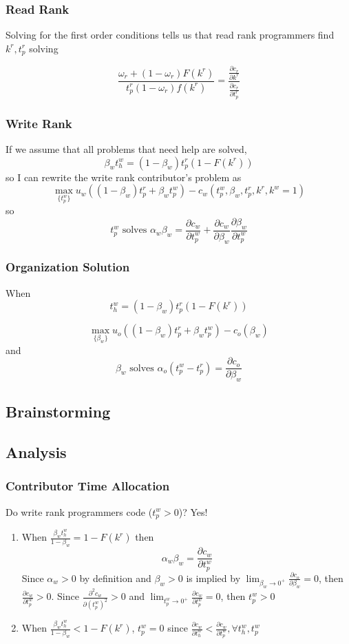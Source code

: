\documentclass[12pt,notitlepage]{article}
\begin{document}
\subsubsection{Read Rank}
Solving for the first order conditions tells us that read rank programmers find $k^r, t_p^r$ solving 


$$\frac{\omega_r + (1-\omega_r) F(k^r)}{t_p^r(1-\omega_r)f(k^r)} = \frac{\frac{\partial c_r}{\partial k^r}}{\frac{\partial c_r}{\partial t_p^r}}$$
\subsubsection{Write Rank}
If we assume that all problems that need help are solved, $$\beta_w t_h^w = (1-\beta_w) t_p^r (1-F(k^r))$$ so I can rewrite the write rank contributor's problem as
$$\max_{\{t_p^w\}} u_w\left((1-\beta_w) t_p^r + \beta_w t_p^w\right) - c_w(t_p^w, \beta_w, t_p^r, k^r, k^w = 1)$$
so $$t_p^w \text{ solves } \alpha_w \beta_w = \frac{\partial c_w}{\partial t_p^w} + \frac{\partial c_w}{\partial \beta_w}\frac{\partial \beta_w}{\partial t_p^w}$$

\subsubsection{Organization Solution}
When $$t_h^w = (1-\beta_w) t_p^r (1-F(k^r))$$ 

$$\max_{\{\beta_w\}} u_o\left((1-\beta_w) t_p^r + \beta_w t_p^w\right) - c_o(\beta_w)$$ 
and $$\beta_w \text{ solves } \alpha_o (t_p^w - t_p^r) = \frac{\partial c_o}{\partial \beta_w}$$

\subsection{Brainstorming}

\subsection{Analysis}
\subsubsection{Contributor Time Allocation}
Do write rank programmers code ($t_p^w>0$)? Yes!
\begin{enumerate}
    \item When $\frac{\beta_w t_h^w}{1-\beta_w} = 1-F(k^r)$ then
    $$\alpha_w \beta_w = \frac{\partial c_w}{\partial t_p^w}$$
    Since $\alpha_w>0$ by definition and $\beta_w>0$ is implied by $\lim_{\beta_w \to 0^+} \frac{\partial c_o}{\partial \beta_w} = 0$, then $\frac{\partial c_w}{\partial t_p^w}>0$. Since $\frac{\partial^2 c_w}{\partial (t_p^w)^2}>0$ and $\lim_{t_p^w \to 0^+} \frac{\partial c_w}{\partial t_p^w} = 0$, then $t_p^w>0$
    \item When $\frac{\beta_w t_h^w}{1-\beta_w} < 1-F(k^r)$, $t_p^w = 0$ since $\frac{\partial c_w}{\partial t_h^w} < \frac{\partial c_w}{\partial t_p^w}, \forall t_h^w, t_p^w$
\end{enumerate}
\end{document}
